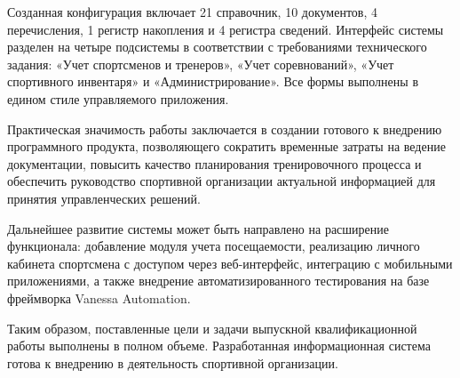 Созданная конфигурация включает 21 справочник, 10 документов, 4 перечисления, 1 регистр накопления и 4 регистра сведений. Интерфейс системы разделен на четыре подсистемы в соответствии с требованиями технического задания: «Учет спортсменов и тренеров», «Учет соревнований», «Учет спортивного инвентаря» и «Администрирование». Все формы выполнены в едином стиле управляемого приложения.

Практическая значимость работы заключается в создании готового к внедрению программного продукта, позволяющего сократить временные затраты на ведение документации, повысить качество планирования тренировочного процесса и обеспечить руководство спортивной организации актуальной информацией для принятия управленческих решений.

Дальнейшее развитие системы может быть направлено на расширение функционала: добавление модуля учета посещаемости, реализацию личного кабинета спортсмена с доступом через веб-интерфейс, интеграцию с мобильными приложениями, а также внедрение автоматизированного тестирования на базе фреймворка Vanessa Automation.

Таким образом, поставленные цели и задачи выпускной квалификационной работы выполнены в полном объеме. Разработанная информационная система готова к внедрению в деятельность спортивной организации.